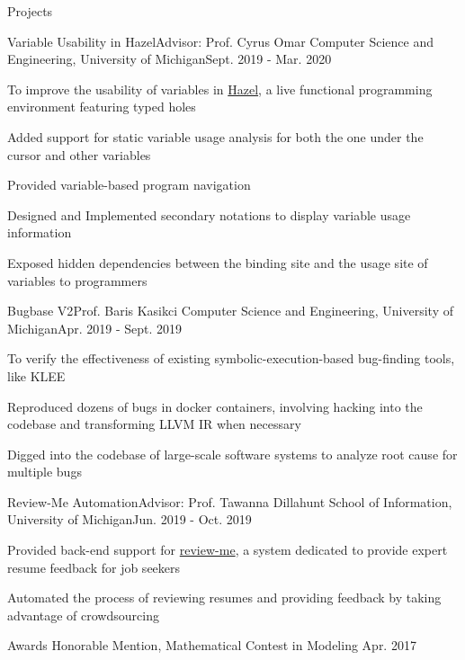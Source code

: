 \documentclass{resume} %
\begin{document}
\begin{rSection}{\large Projects}
\begin{rSubsection}
  {Variable Usability in Hazel}{Advisor: Prof. Cyrus Omar}
  {Computer Science and Engineering, University of Michigan}{Sept. 2019 - Mar. 2020}
\item To improve the usability of variables in \href{https://hazel.org/build/dev/index.html}{\textsf{Hazel}}, a live functional programming environment featuring typed holes
\item Added support for static variable usage analysis for both the one under the
  cursor and other variables
\item Provided variable-based program navigation 
\item Designed and Implemented secondary notations to display variable usage information
\item Exposed hidden dependencies between the binding site and the usage site of
  variables to programmers
\end{rSubsection}
\begin{rSubsection}
  {Bugbase V2}{Prof. Baris Kasikci}
  {Computer Science and Engineering, University of Michigan}{Apr. 2019 - Sept. 2019}
\item To verify the effectiveness of existing symbolic-execution-based bug-finding tools, like KLEE
\item Reproduced dozens of bugs in docker containers, involving hacking into the codebase and transforming LLVM IR when necessary
\item Digged into the codebase of large-scale software systems to analyze root
  cause for multiple bugs
\end{rSubsection}

\begin{rSubsection}{Review-Me Automation}{Advisor: Prof. Tawanna Dillahunt}
  {School of Information, University of Michigan}{Jun. 2019 - Oct. 2019}
\item Provided back-end support for \href{https://review-me.us}{review-me}, a system dedicated to provide expert resume feedback for job seekers
\item Automated the process of reviewing resumes and providing feedback by taking advantage of crowdsourcing
\end{rSubsection}

\end{rSection}
\begin{rSection}{\large Awards}
Honorable Mention, Mathematical Contest in Modeling \hfill {Apr. 2017}

\end{rSection}
\end{document}
